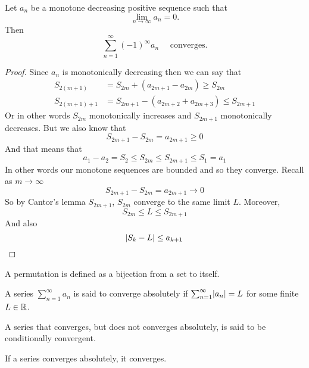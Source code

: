 \documentclass[11pt,a4paper]{article}
\begin{document}
	\newpage
	
  \begin{proposition}
    Let $a_n$ be a monotone decreasing positive sequence such that
    \[
      \lim_{n\to\infty} a_n = 0.
    \]
    Then
    \[
      \sum_{n=1}^{\infty}(-1)^{\infty}{a_n} \quad \text{ converges}.
    \]
  \end{proposition}
  \begin{proof}
    Since $a_n$ is monotonically decreasing then we can say that
    \begin{align*}
      S_{2(m+1)} &= S_{2m} + (a_{2m+1} - a_{2m}) \ge S_{2m} \\
      S_{2(m+1)+1} &= S_{2m + 1} - (a_{2m+2} + a_{2m+3}) \le S_{2m + 1}
    \end{align*}
    Or in other words $S_{2m}$ monotonically increases and 
    $S_{2m+1}$  monotonically decreases. 
    But we also know that
    \[
      S_{2m+1} - S_{2m} =  a_{2m + 1} \ge 0
    \]
    And that means that
    \[
      a_1 - a_2 = S_2 \le S_{2m} \le S_{2m+1} \le S_1 = a_1
    \]
    In other words our monotone sequences are bounded and so they converge. 
    Recall as $m\to\infty$
    \[
      S_{2m + 1} - S_{2m} =  a_{2m + 1} \to 0
    \]
    So by Cantor's lemma $S_{2m+1}$, $S_{2m}$ converge to the same limit $L$.
    Moreover,
    \[
      S_{2m} \le L \le S_{2m + 1}
    \]
    And also
    \[
      \abs{S_k - L} \le a_{k + 1}
    \]
  \end{proof}
	
  \begin{definition}[Permutation]
    A permutation is defined as a bijection from a set to itself.
  \end{definition}

  \begin{definition}
    A series $\sum_{n=1}^{\infty} a_n$ is said to converge absolutely 
    if $\sum_{n=1}^{\infty} \abs{a_n} = L$ for some finite $L \in \mathbb{R}$.
  \end{definition}
  \begin{remark}
    A series that converges, but does not converges absolutely, is said
    to be conditionally convergent.
  \end{remark}
  \begin{remark}
    If a series converges absolutely, it converges.
  \end{remark}
\end{document}
